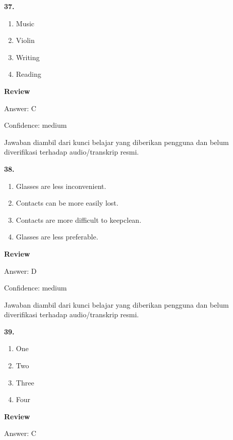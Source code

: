 \documentclass[12pt]{article}
\begin{document}
\noindent\textbf{37.}
\begin{enumerate}[label=(\Alph*),leftmargin=*,itemsep=0.2em]
\item Music
\item Violin
\item Writing
\item Reading
\end{enumerate}
\par
\begingroup
\setlength{\parskip}{0pt}
\setlength{\parindent}{0pt}
\textbf{Review}\par
Answer: C\par
Confidence: medium\par
Jawaban diambil dari kunci belajar yang diberikan pengguna dan belum diverifikasi terhadap audio/transkrip resmi.\par
\endgroup
\par
\vspace{0.25\baselineskip}
\noindent\textbf{38.}
\begin{enumerate}[label=(\Alph*),leftmargin=*,itemsep=0.2em]
\item Glasses are less inconvenient.
\item Contacts can be more easily lost.
\item Contacts are more difficult to keepclean.
\item Glasses are less preferable.
\end{enumerate}
\par
\begingroup
\setlength{\parskip}{0pt}
\setlength{\parindent}{0pt}
\textbf{Review}\par
Answer: D\par
Confidence: medium\par
Jawaban diambil dari kunci belajar yang diberikan pengguna dan belum diverifikasi terhadap audio/transkrip resmi.\par
\endgroup
\par
\vspace{0.25\baselineskip}
\noindent\textbf{39.}
\begin{enumerate}[label=(\Alph*),leftmargin=*,itemsep=0.2em]
\item One
\item Two
\item Three
\item Four
\end{enumerate}
\par
\begingroup
\setlength{\parskip}{0pt}
\setlength{\parindent}{0pt}
\textbf{Review}\par
Answer: C\par
\end{document}
